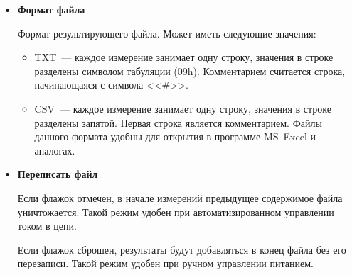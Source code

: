 \documentclass[12pt, a4paper, twocolumn]{book}
\newcommand{\PARAM}[1]{\item {\bf #1} }
\begin{document}
\begin{itemize}
\PARAM{Формат файла}

Формат результирующего файла. Может иметь следующие значения:

\begin{itemize}
\item TXT~--- каждое измерение занимает одну строку, значения в строке разделены символом табуляции (09h). Комментарием считается строка, начинающаяся с символа <<\#>>.
\item CSV~--- каждое измерение занимает одну строку, значения в строке разделены запятой. Первая строка является комментарием. Файлы данного формата удобны для открытия в программе MS~Excel и аналогах.
\end{itemize}

\PARAM{Переписать файл}

Если флажок отмечен, в начале измерений предыдущее содержимое файла уничтожается. Такой режим удобен при автоматизированном управлении током в цепи.

Если флажок сброшен, результаты будут добавляться в конец файла без его перезаписи. Такой режим удобен при ручном управлении питанием.

\end{itemize}
\end{document}
